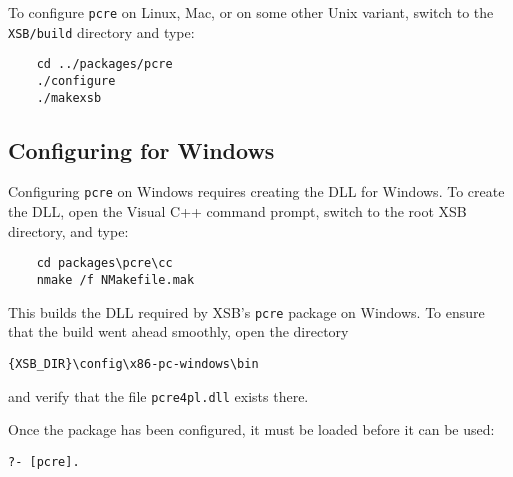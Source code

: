 To configure {\tt pcre} on Linux, Mac, or on some other Unix variant, switch to the {\tt XSB/build} directory and type:

\begin{verbatim}
    cd ../packages/pcre
    ./configure
    ./makexsb
\end{verbatim}


\subsection{Configuring for Windows}

Configuring {\tt pcre} on Windows requires creating the DLL for Windows. To create the DLL, open the Visual C++ command prompt, switch to the root XSB directory, and type:

\begin{verbatim}
	cd packages\pcre\cc
	nmake /f NMakefile.mak
\end{verbatim}

This builds the DLL required by XSB's {\tt pcre} package on Windows. To
ensure that the build went ahead smoothly, open the directory
\begin{verbatim}
{XSB_DIR}\config\x86-pc-windows\bin
\end{verbatim}
and verify that the file {\tt pcre4pl.dll} exists there.

Once the package has been configured, it must be loaded before it can be used:
\begin{verbatim}
?- [pcre].
\end{verbatim}



